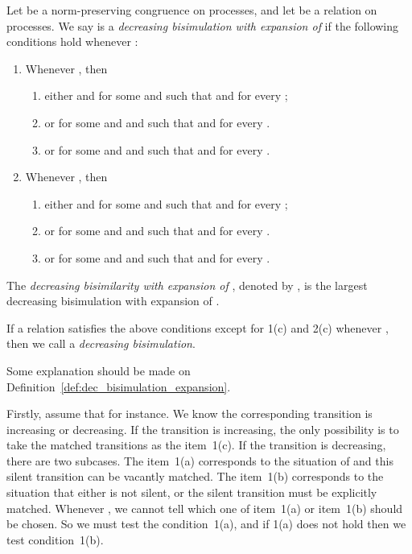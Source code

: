 \documentclass{llncs}
\begin{document}
\begin{definition}\label{def:dec_bisimulation_expansion}
Let  be a norm-preserving congruence on processes, and
let  be a relation on processes.  We say  is a {\em decreasing bisimulation with expansion of}   if the following conditions hold whenever :


\begin{enumerate}
\item
Whenever , then
\begin{enumerate}
\item
either  and  for some  and  such that  and  for every ;

\item
or  for some  and  and  such that  and  for every .

\item
or  for some  and  and  such that  and  for every .
\end{enumerate}

\item
Whenever , then
\begin{enumerate}
\item
either  and     for some  and  such that  and  for every ;

\item
or  for some  and  and  such that  and  for every .

\item
or  for some  and  and  such that  and  for every .
\end{enumerate}
\end{enumerate}


The {\em decreasing bisimilarity with expansion of }, denoted by  , is the largest decreasing bisimulation with expansion of .

If a relation  satisfies the above conditions except for 1(c) and 2(c) whenever , then we call  a {\em decreasing bisimulation}.
\end{definition}



Some explanation should be made on Definition~\ref{def:dec_bisimulation_expansion}.

Firstly, assume that  for instance.
We know the corresponding transition is increasing or decreasing.  If the transition is increasing, the only possibility is to take the matched transitions as the item~1(c).  If the transition is decreasing, there are two subcases. The item~1(a) corresponds to the situation of  and this silent transition can be vacantly matched.  The item~1(b) corresponds to the situation that either  is not silent, or the silent transition must be explicitly matched.  Whenever , we cannot tell which one of item~1(a) or item~1(b) should be chosen. So we must test the condition~1(a), and if 1(a) does not hold then we test condition~1(b).
\end{document}
